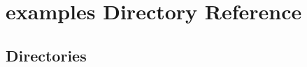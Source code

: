 \section{examples Directory Reference}
\label{dir_527496d0944488e897364a6d211c78eb}
\subsection*{Directories}
\begin{DoxyCompactItemize}
\end{DoxyCompactItemize}
